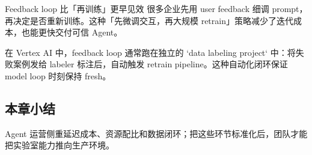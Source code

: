 \begin{knowledgebox}{Feedback loop 比「再训练」更早见效}
很多企业先用 user feedback 细调 prompt，再决定是否重新训练。这种「先微调交互，再大规模 retrain」策略减少了迭代成本，也能更快交付可信 Agent。
\end{knowledgebox}

在 Vertex AI 中，feedback loop 通常跑在独立的 `data labeling project` 中：将失败案例发给 labeler 标注后，自动触发 retrain pipeline。这种自动化闭环保证 model loop 时刻保持 fresh。

\subsection{本章小结}

Agent 运营侧重延迟成本、资源配比和数据闭环；把这些环节标准化后，团队才能把实验室能力推向生产环境。

